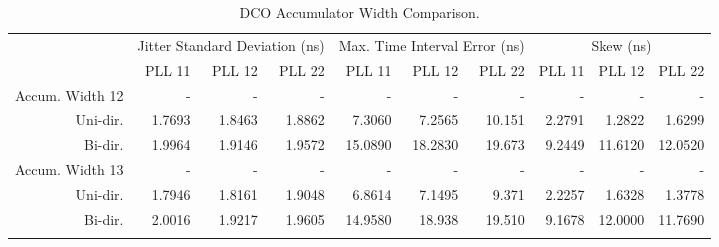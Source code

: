 \begin{table}[!ht]
    \begin{center}
        \begin{footnotesize}
            \setlength{\tabcolsep}{.9\tabcolsep}
            \begin{tabular}{ll|r|r|r|r|r|r|r|r|r|}           
                \cline{3-11}
                && \multicolumn{3}{c|}{Jitter Standard Deviation (ns)} & \multicolumn{3}{c|}{Max. Time Interval Error (ns)} & \multicolumn{3}{c|}{Skew (ns)} \T\\
                \cline{3-11} 
                &&PLL 11&PLL 12&PLL 22    &PLL 11&PLL 12&PLL 22    &PLL 11&PLL 12&PLL 22\T\\
                \hline
                \multicolumn{2}{|l|}{Accum. Width 12}&-&-&-&-&-&-&-&-&-\T\\
                \multicolumn{2}{|r|}{Uni-dir.}  &1.7693 &1.8463 &1.8862    &7.3060  &7.2565  &10.151    &2.2791 &1.2822  &1.6299  \T\\
                \multicolumn{2}{|r|}{Bi-dir.}   &1.9964 &1.9146 &1.9572    &15.0890 &18.2830 &19.673    &9.2449 &11.6120 &12.0520 \T\\
                \hline
                \multicolumn{2}{|l|}{Accum. Width 13}&-&-&-&-&-&-&-&-&-\T\\
                \multicolumn{2}{|r|}{Uni-dir.}  &1.7946 &1.8161 &1.9048    &6.8614  &7.1495 &9.371      &2.2257 &1.6328  &1.3778  \T\\
                \multicolumn{2}{|r|}{Bi-dir.}   &2.0016 &1.9217 &1.9605    &14.9580 &18.938 &19.510     &9.1678 &12.0000 &11.7690 \T\\
                \hline
                \B
            \end{tabular}
        \end{footnotesize}
        \caption{\ac{DCO} Accumulator Width Comparison.}
        \label{table:accum_width}
    \end{center}
    \vspace{-0.5cm}
\end{table}

